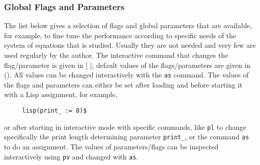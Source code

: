\subsubsection{Global Flags and Parameters}

The list below gives a selection of flags and global parameters that
are available, for example, to fine tune the performance according to
specific needs of the system of equations that is studied.  Usually
they are not needed and very few are used regularly by the author.
The interactive command that changes the flag/parameter is given in [
], default values of the flags/parameters are given in ().  All values
can be changed interactively with the \texttt{as} command.  The values
of the flags and parameters can either be set after loading
 and before starting it with a Lisp assignment, for
example,
\begin{verbatim}
     lisp(print_ := 8)$
\end{verbatim}
or after starting  in interactive mode with specific
commands, like \texttt{pl} to change specifically the print length
determining parameter \texttt{print\_}, or the command \texttt{as} to
do an assignment.  The values of parameters/flags can be inspected
interactively using \texttt{pv} and changed with \texttt{as}.

